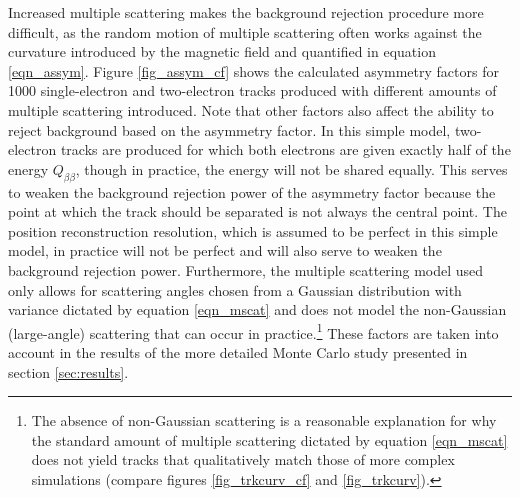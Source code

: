 \documentclass{JINST}
\begin{document}
Increased multiple scattering makes the background rejection procedure more difficult, as the random motion
of multiple scattering often works against the curvature introduced by the magnetic field and quantified in
equation \ref{eqn_assym}.  Figure \ref{fig_assym_cf} shows the calculated asymmetry factors for 1000 
single-electron and two-electron tracks produced with different amounts of multiple scattering introduced.
Note that other factors also affect the ability to reject background based on the asymmetry factor.  In this
simple model, two-electron tracks are produced for which both electrons are given exactly half of the energy
$Q_{\beta\beta}$, though in practice, the energy will not be shared equally.  This serves to weaken the
background rejection power of the asymmetry factor because the point at which the track should be separated
is not always the central point.  The position reconstruction resolution, which is assumed to be perfect in this
simple model, in practice will not be perfect and will also serve to weaken the background rejection power.
Furthermore, the multiple scattering model used only allows for scattering angles chosen from a Gaussian
distribution with variance dictated by equation \ref{eqn_mscat} and does not model the
non-Gaussian (large-angle) scattering that can occur in practice.\footnote{The absence of non-Gaussian
scattering is a reasonable explanation for why the standard amount of multiple scattering dictated by equation
\ref{eqn_mscat} does not yield tracks that qualitatively match those of more complex simulations (compare
figures \ref{fig_trkcurv_cf} and \ref{fig_trkcurv}).}  These factors are taken into account in the 
results of the more detailed Monte Carlo study presented in section \ref{sec:results}.
\end{document}
